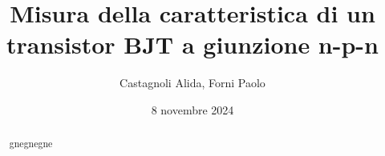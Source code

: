 \documentclass[11pt]{article}
\begin{document}

    \title{\textbf{Misura della caratteristica di un transistor BJT a giunzione n-p-n}}
    \author{Castagnoli Alida, Forni Paolo}
    \date{8 novembre 2024}
    \maketitle


    \vspace{-23pt}  %

    \begin{abstract}


        gnegnegne

    \end{abstract}
    
    
    
    
    \newpage

    \appendix
    
\end{document}
